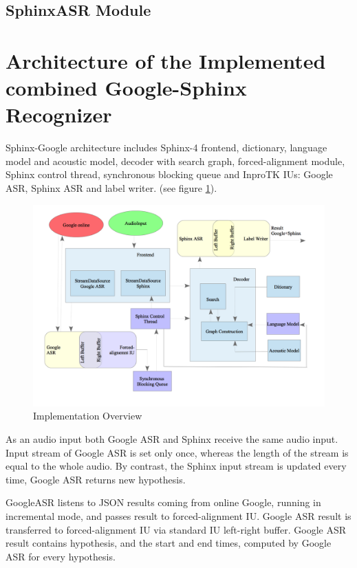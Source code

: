 \subsection {SphinxASR Module}
\section {Architecture of the Implemented combined Google-Sphinx Recognizer}
Sphinx-Google architecture includes Sphinx-4 frontend, dictionary,
language model and acoustic model, decoder with search graph, forced-alignment
module, Sphinx control thread, synchronous blocking queue and InproTK IUs:
Google ASR, Sphinx ASR and label writer.  (see figure \ref {fig:arch}).
\begin{figure}[htbp]
  \centering
    \includegraphics[width=1\textwidth]{images/architecture.png}
 \caption{Implementation Overview}
  \label{fig:arch}
\end {figure} 

As an audio input both Google ASR and Sphinx receive the same audio input.
Input stream of Google ASR is set only once, whereas the length of
the stream is equal to the whole audio. By contrast, the Sphinx input stream is
updated every time, Google ASR returns new hypothesis. 

GoogleASR listens to JSON results coming from online Google, running
in incremental mode, and passes result to forced-alignment IU. Google ASR result
is transferred to forced-alignment IU via standard IU left-right buffer. Google
ASR result contains hypothesis, and the start and end times, computed by Google
ASR for every hypothesis. 

